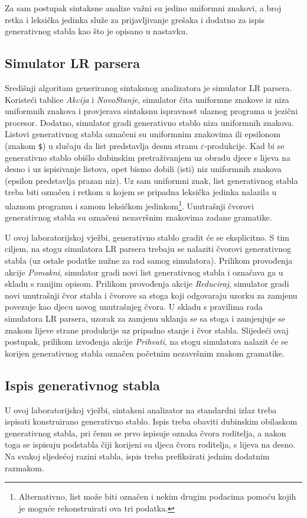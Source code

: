 \documentclass[times, 12pt, utf8]{book}
\begin{document}
Za sam postupak sintaksne analize važni su jedino uniformni znakovi, a broj retka i leksička jedinka služe za prijavljivanje grešaka i dodatno za ispis generativnog stabla kao što je opisano u nastavku.

\subsection{Simulator LR parsera}
Središnji algoritam generiranog sintaksnog analizatora je simulator LR parsera.
Koristeći tablice {\em Akcija} i {\em NovoStanje}, simulator čita uniformne znakove iz niza uniformnih znakova i provjerava sintaksnu ispravnost ulaznog programa u jezični procesor.
Dodatno, simulator gradi generativno stablo niza uniformnih znakova.
Listovi generativnog stabla označeni su uniformnim znakovima ili epsilonom (znakom \verb|$|) u slučaju da list predstavlja desnu stranu \(\varepsilon\)-produkcije.
Kad bi se generativno stablo obišlo dubinskim pretraživanjem uz obradu djece s lijeva na desno i uz ispisivanje listova, opet bismo dobili (isti) niz uniformnih znakova (epsilon predstavlja prazan niz).
Uz sam uniformni znak, list generativnog stabla treba biti označen i retkom u kojem se pripadna leksička jedinka nalazila u ulaznom programu i samom leksičkom jedinkom\footnote{Alternativno, list može biti označen i nekim drugim podacima pomoću kojih je moguće rekonstruirati ova tri podatka.}.
Unutrašnji čvorovi generativnog stabla su označeni nezavršnim znakovima zadane gramatike.

U ovoj laboratorijskoj vježbi, generativno stablo gradit će se eksplicitno.
S tim ciljem, na stogu simulatora LR parsera trebaju se nalaziti čvorovi generativnog stabla (uz ostale podatke nužne za rad samog simulatora).
Prilikom provođenja akcije {\em Pomakni}, simulator gradi novi list generativnog stabla i označava ga u skladu s ranijim opisom.
Prilikom provođenja akcije {\em Reduciraj}, simulator gradi novi unutrašnji čvor stabla i čvorove sa stoga koji odgovaraju uzorku za zamjenu povezuje kao djecu novog unutrašnjeg čvora.
U skladu s pravilima rada simulatora LR parsera, uzorak za zamjenu uklanja se sa stoga i zamjenjuje se znakom lijeve strane produkcije uz pripadno stanje i čvor stabla.
Slijedeći ovaj postupak, prilikom izvođenja akcije {\em Prihvati}, na stogu simulatora nalazit će se korijen generativnog stabla označen početnim nezavršnim znakom gramatike.

\subsection{Ispis generativnog stabla}\label{sec:syn_ispis}
U ovoj laboratorijskoj vježbi, sintaksni analizator na standardni izlaz treba ispisati konstruirano generativno stablo.
Ispis treba obaviti dubinskim obilaskom generativnog stabla, pri čemu se prvo ispisuje oznaka čvora roditelja, a nakon toga se ispisuju podstabla čiji korijeni su djeca čvora roditelja, s lijeva na desno.
Na svakoj sljedećoj razini stabla, ispis treba prefiksirati jednim dodatnim razmakom.
\end{document}
